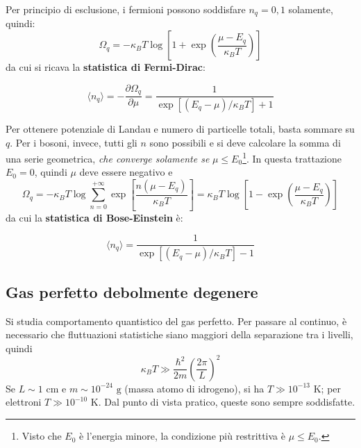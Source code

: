 \documentclass[10pt, a4paper]{scrartcl}
\numberwithin{equation}{subsection}
\theoremstyle{style1}
\newenvironment{boxenv}[1][]{
    \begin{eqbox}[#1]
    }{
   \end{eqbox}
}
\begin{document}
Per principio di esclusione, i fermioni possono soddisfare $n_q = 0,1$ solamente, quindi:
\begin{equation}\label{ofd}
	\Omega _q = -\kappa _B T \log \left[ 1+ \exp\left(\frac{\mu  - E_q}{\kappa _B T}\right)  \right] 
\end{equation}
da cui si ricava la \textbf{statistica di Fermi-Dirac}:
\begin{boxenv}[]
\begin{equation}
	\langle n_q \rangle = - \frac{\partial \Omega _q}{\partial \mu } = \frac{1}{\exp \left[ (E_q - \mu ) / \kappa_B T \right]  + 1}
\end{equation}
\end{boxenv}
\noindent Per ottenere potenziale di Landau e numero di particelle totali, basta sommare su $q$. Per i bosoni, invece, tutti gli $n$ sono possibili e si deve calcolare la somma di una serie geometrica, \textit{che converge solamente se} $\mu \le  E_0$\footnote{Visto che $E_0$ \`e l'energia minore, la condizione pi\`u restrittiva \`e $\mu \le E_0$.}. In questa trattazione $E_0=0$, quindi $\mu $ deve essere negativo e
\begin{equation}\label{obe}
	\Omega _q = - \kappa _B T \log \sum_{n=0}^{+\infty} \exp \left[ \frac{n(\mu  - E_q)}{\kappa _B T} \right] = \kappa _B T \log \left[1 - \exp\left(\frac{\mu  - E_q}{\kappa _B T}\right) \right]
\end{equation}
da cui la \textbf{statistica di Bose-Einstein} \`e:
\begin{boxenv}[]
\begin{equation}
	\langle n_q \rangle = \frac{1}{\exp\left[ (E_q - \mu )/\kappa _B T \right] - 1}
\end{equation}
\end{boxenv}
\subsection{Gas perfetto debolmente degenere}
Si studia comportamento quantistico del gas perfetto. Per passare al continuo, \`e necessario che fluttuazioni statistiche siano maggiori della separazione tra i livelli, quindi
\begin{equation}
	\kappa _B T \gg \frac{\hbar ^2}{2m} \left(\frac{2\pi}{L}\right) ^2
\end{equation}
Se $L\sim 1 \text{ cm}$ e $m\sim 10^{-24} \text{ g}$ (massa atomo di idrogeno), si ha $T \gg 10^{-13} $ K; per elettroni $T\gg 10^{-10} $ K. Dal punto di vista pratico, queste sono sempre soddisfatte.
\end{document}
